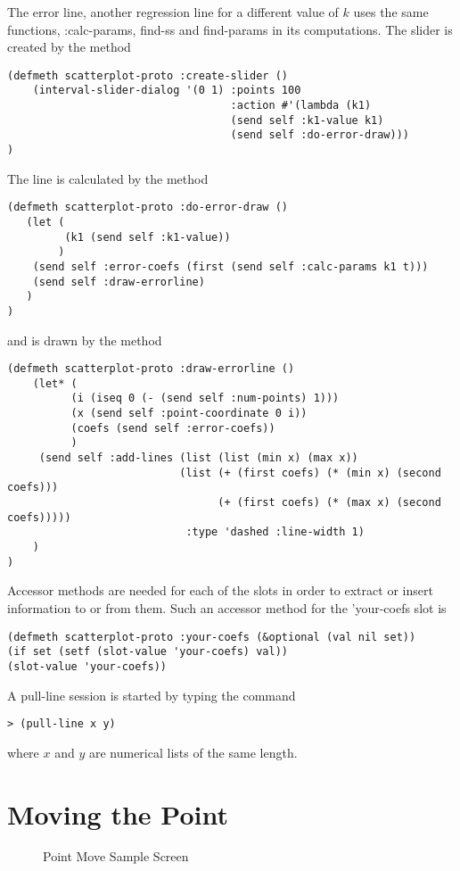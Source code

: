\documentclass[11pt]{report}
\begin{document}
  The error line, another regression line for a different value of $k$ uses
the same functions, :calc-params, find-ss and find-params in its 
computations.  The slider is created by the method
\begin{verbatim}
(defmeth scatterplot-proto :create-slider ()
    (interval-slider-dialog '(0 1) :points 100
                                   :action #'(lambda (k1)
                                   (send self :k1-value k1)
                                   (send self :do-error-draw)))
)
\end{verbatim}
The line is calculated by the method
\begin{verbatim}
(defmeth scatterplot-proto :do-error-draw ()
   (let (
         (k1 (send self :k1-value))
        )
    (send self :error-coefs (first (send self :calc-params k1 t)))
    (send self :draw-errorline)
   )
)
\end{verbatim}
and is drawn by the method
\begin{verbatim}
(defmeth scatterplot-proto :draw-errorline ()
    (let* (
          (i (iseq 0 (- (send self :num-points) 1)))
          (x (send self :point-coordinate 0 i))
          (coefs (send self :error-coefs))
          )
     (send self :add-lines (list (list (min x) (max x))
                           (list (+ (first coefs) (* (min x) (second coefs)))
                                 (+ (first coefs) (* (max x) (second coefs)))))
                            :type 'dashed :line-width 1)
    )
)
\end{verbatim}

    Accessor methods are needed for each of the slots in order to extract
or insert information to or from them.  Such an accessor method for the 
'your-coefs slot is 
\begin{verbatim}
(defmeth scatterplot-proto :your-coefs (&optional (val nil set))
(if set (setf (slot-value 'your-coefs) val))
(slot-value 'your-coefs))
\end{verbatim}
 
   A pull-line session is started by typing the command
\begin{verbatim}
> (pull-line x y)
\end{verbatim}
where $x$ and $y$ are numerical lists of the same length.

\chapter{Moving the Point}
\begin{figure}
   \centering
   \centerline{}
   \caption{Point Move Sample Screen\label{pict4}}
\end{figure}
\end{document}
